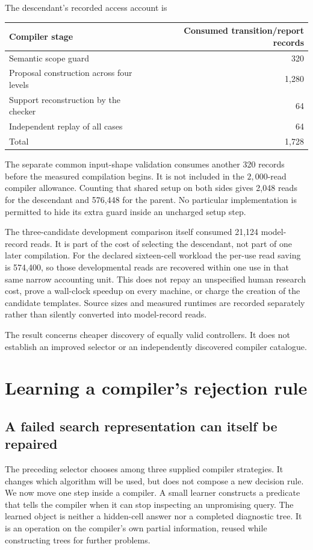 The descendant's recorded access account is
\begin{center}\begin{tabular}{@{}lr@{}}\toprule
Compiler stage & Consumed transition/report records\\\midrule
Semantic scope guard & 320\\
Proposal construction across four levels & 1,280\\
Support reconstruction by the checker & 64\\
Independent replay of all cases & 64\\\midrule
Total & 1,728\\\bottomrule
\end{tabular}\end{center}
The separate common input-shape validation consumes another 320 records before the measured compilation begins. It is not included in the $2{,}000$-read compiler allowance. Counting that shared setup on both sides gives 2,048 reads for the descendant and 576,448 for the parent. No particular implementation is permitted to hide its extra guard inside an uncharged setup step.

The three-candidate development comparison itself consumed 21,124 model-record reads. It is part of the cost of selecting the descendant, not part of one later compilation. For the declared sixteen-cell workload the per-use read saving is 574,400, so those developmental reads are recovered within one use in that same narrow accounting unit. This does not repay an unspecified human research cost, prove a wall-clock speedup on every machine, or charge the creation of the candidate templates. Source sizes and measured runtimes are recorded separately rather than silently converted into model-record reads.

The result concerns cheaper discovery of equally valid controllers. It does not establish an improved selector or an independently discovered compiler catalogue.


\chapter{Learning a compiler's rejection rule}\label{SII:book:chapter-62}
\label{SII:part:rule-learning}
\section{A failed search representation can itself be repaired}\label{SII:sec:search-features}
The preceding selector chooses among three supplied compiler strategies. It changes which algorithm will be used, but does not compose a new decision rule. We now move one step inside a compiler. A small learner constructs a predicate that tells the compiler when it can stop inspecting an unpromising query. The learned object is neither a hidden-cell answer nor a completed diagnostic tree. It is an operation on the compiler's own partial information, reused while constructing trees for further problems.

